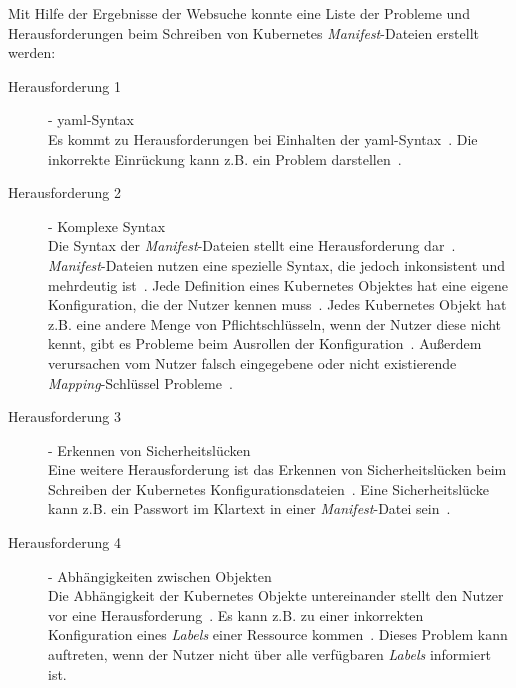 Mit Hilfe der Ergebnisse der Websuche konnte eine Liste der Probleme und Herausforderungen beim Schreiben von Kubernetes \textit{Manifest}-Dateien erstellt werden:
\begin{description}
    \item[Herausforderung 1]{- \ac{yaml}-Syntax\\}
          Es kommt zu Herausforderungen bei Einhalten der \ac{yaml}-Syntax~\cite{10.1145/3357223.3365759,the-chief-io-kubernetes-challenges,techtarget-kubernetes-challenges,monokle-kubernetes-challenges}.
          Die inkorrekte Einrückung kann z.B. ein Problem darstellen~\cite{10.1145/3357223.3365759,monokle-kubernetes-challenges}.
    \item[Herausforderung 2]{- Komplexe Syntax\\}
          Die Syntax der \textit{Manifest}-Dateien stellt eine Herausforderung dar~\cite{dev-to-kubernetes-challenges,kubetools-io-kubernetes-manifest-management,entwickler-de-kubernetes-problems,newstack-io-kubernetes-manifest-lifecycle,10.1145/3357223.3365759,techtarget-kubernetes-challenges,monokle-kubernetes-challenges,kubernetes-config-problems}.
          \textit{Manifest}-Dateien nutzen eine spezielle Syntax, die jedoch inkonsistent und mehrdeutig ist~\cite{dev-to-kubernetes-challenges}.
          Jede Definition eines Kubernetes Objektes hat eine eigene Konfiguration, die der Nutzer kennen muss~\cite{kubetools-io-kubernetes-manifest-management,entwickler-de-kubernetes-problems}.
          Jedes Kubernetes Objekt hat z.B. eine andere Menge von Pflichtschlüsseln, wenn der Nutzer diese nicht kennt, gibt es Probleme beim Ausrollen der Konfiguration~\cite{10.1145/3357223.3365759, techtarget-kubernetes-challenges}.
          Außerdem verursachen vom Nutzer falsch eingegebene oder nicht existierende \textit{Mapping}-Schlüssel Probleme~\cite{monokle-kubernetes-challenges}.
    \item[Herausforderung 3]{- Erkennen von Sicherheitslücken\\}
          Eine weitere Herausforderung ist das Erkennen von Sicherheitslücken beim Schreiben der Kubernetes Konfigurationsdateien~\cite{9476056,dynatrace-kubernetes-security-challenges,10.1145/3468264.3473495,10.1145/3579639}.
          Eine Sicherheitslücke kann z.B. ein Passwort im Klartext in einer \textit{Manifest}-Datei sein~\cite{10.1145/3579639}.
    \item[Herausforderung 4]{- Abhängigkeiten zwischen Objekten\\}
          Die Abhängigkeit der Kubernetes Objekte untereinander stellt den Nutzer vor eine Herausforderung~\cite{dev-to-kubernetes-challenges,kubetools-io-kubernetes-manifest-management,spacelift-io-kubernetes-challenges,qovery-kubernetes-challenges}.
          Es kann z.B. zu einer inkorrekten Konfiguration eines \textit{Labels} einer Ressource kommen~\cite{spacelift-io-kubernetes-challenges,qovery-kubernetes-challenges}.
          Dieses Problem kann auftreten, wenn der Nutzer nicht über alle verfügbaren \textit{Labels} informiert ist.
\end{description}

